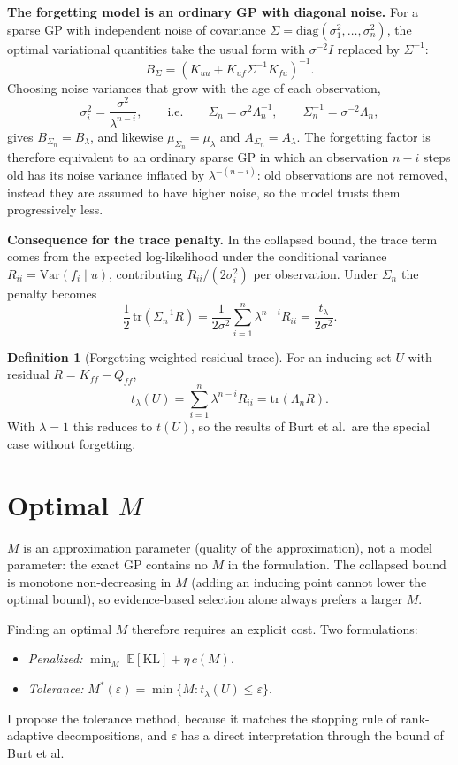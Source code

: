\documentclass[11pt,a4paper]{article}
\theoremstyle{definition}
\newtheorem{definition}{Definition}
\theoremstyle{remark}
\newcommand{\KL}{\mathrm{KL}}
\newcommand{\tr}{\mathrm{tr}}
\begin{document}
\textbf{The forgetting model is an ordinary GP with diagonal noise.}
For a sparse GP with independent noise of covariance $\Sigma = \mathrm{diag}(\sigma_1^2, \ldots, \sigma_n^2)$, the optimal variational quantities take the usual form with $\sigma^{-2}I$ replaced by $\Sigma^{-1}$:
\[
B_\Sigma = \left(K_{uu} + K_{uf}\Sigma^{-1}K_{fu}\right)^{-1}.
\]
Choosing noise variances that grow with the age of each observation,
\[
\sigma_i^2 = \frac{\sigma^2}{\lambda^{n-i}}, \qquad\text{i.e.}\qquad
\Sigma_n = \sigma^2\Lambda_n^{-1}, \qquad \Sigma_n^{-1} = \sigma^{-2}\Lambda_n,
\]
gives $B_{\Sigma_n} = B_\lambda$, and likewise $\mu_{\Sigma_n} = \mu_\lambda$ and $A_{\Sigma_n} = A_\lambda$. The forgetting factor is therefore equivalent to an ordinary sparse GP in which an observation $n-i$ steps old has its noise variance inflated by $\lambda^{-(n-i)}$: old observations are not removed, instead they are assumed to have higher noise, so the model trusts them progressively less.

\textbf{Consequence for the trace penalty.}
In the collapsed bound, the trace term comes from the expected log-likelihood under the conditional variance $R_{ii} = \mathrm{Var}(f_i \mid u)$, contributing $R_{ii}/(2\sigma_i^2)$ per observation. Under $\Sigma_n$ the penalty becomes
\[
\frac12\,\tr\left(\Sigma_n^{-1}R\right)
= \frac{1}{2\sigma^2}\sum_{i=1}^{n}\lambda^{n-i}R_{ii}
= \frac{t_\lambda}{2\sigma^2}.
\]

\begin{definition}[Forgetting-weighted residual trace]
For an inducing set $U$ with residual $R = K_{ff} - Q_{ff}$,
\[
t_\lambda(U) = \sum_{i=1}^{n}\lambda^{n-i}R_{ii} = \tr\left(\Lambda_n R\right).
\]
With $\lambda = 1$ this reduces to $t(U)$, so the results of Burt et al.\ are the special case without forgetting.
\end{definition}

\section{Optimal $M$}

$M$ is an approximation parameter (quality of the approximation), not a model parameter: the exact GP contains no $M$ in the formulation. The collapsed bound is monotone non-decreasing in $M$ (adding an inducing point cannot lower the optimal bound), so evidence-based selection alone always prefers a larger $M$.

Finding an optimal $M$ therefore requires an explicit cost. Two formulations:
\begin{itemize}
  \item \emph{Penalized:} $\displaystyle\min_M\; \mathbb{E}[\KL] + \eta\,c(M)$.
  \item \emph{Tolerance:} $\displaystyle M^*(\varepsilon) = \min\{M : t_\lambda(U) \leq \varepsilon\}$.
\end{itemize}
I propose the tolerance method, because it matches the stopping rule of rank-adaptive decompositions, and $\varepsilon$ has a direct interpretation through the bound of Burt et al.
\end{document}
